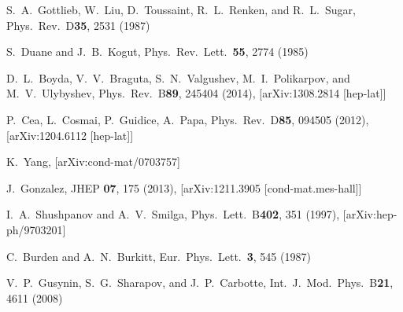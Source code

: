 \documentclass[aps,prd,twocolumn,showpacs,superscriptaddress,groupedaddress]{revtex4}  %
\begin{document}
\begin{thebibliography}{99}
S.~A.~Gottlieb, W.~Liu, D.~Toussaint, R.~L.~Renken, and R.~L.~Sugar, Phys.\ Rev.\ D{\bf 35}, 2531 (1987)

S.~Duane and J.~B.~Kogut, Phys.\ Rev.\ Lett.\ {\bf 55}, 2774 (1985)

D.~L.~Boyda, V.~V.~Braguta, S.~N.~Valgushev, M.~I.~Polikarpov, and M.~V.~Ulybyshev, Phys.\ Rev.\ B{\bf 89}, 245404 (2014), [arXiv:1308.2814 [hep-lat]]

P.~Cea, L.~Cosmai, P.~Guidice, A.~Papa, Phys.\ Rev.\ D{\bf85}, 094505 (2012), [arXiv:1204.6112 [hep-lat]]

K.~Yang, [arXiv:cond-mat/0703757]

J.~Gonzalez, JHEP {\bf 07}, 175 (2013), 	[arXiv:1211.3905 [cond-mat.mes-hall]]

I.~A.~Shushpanov and A.~V.~Smilga, Phys.\ Lett.\ B{\bf 402}, 351 (1997), [arXiv:hep-ph/9703201]

C.~Burden and A.~N.~Burkitt, Eur.\ Phys.\ Lett.\ {\bf 3}, 545 (1987)

V.~P.~Gusynin, S.~G.~Sharapov, and J.~P.~Carbotte, Int.\ J.\ Mod.\ Phys.\ B{\bf 21}, 4611 (2008) 

\end{thebibliography}
\end{document}
